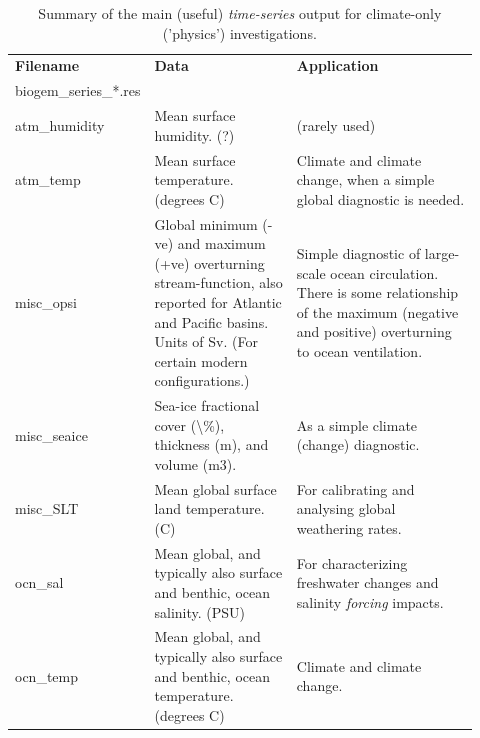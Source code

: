 \documentclass[11pt,fleqn]{book} %
\begin{document}
\begin{table}[ht]
\begin{tabular}{p{0.2\linewidth} p{0.317\linewidth} p{0.4\linewidth}}
\toprule
\textbf{Filename} & \textbf{Data} & \textbf{Application}\\
\textsf{\footnotesize biogem\_series\_*.res} & &\\
\midrule
\textsf{\footnotesize atm\_humidity} & \small{Mean surface humidity. (?)} & \small{(rarely used)}\\
\textsf{\footnotesize atm\_temp} & \small{Mean surface temperature. (degrees C)} & \small{Climate and climate change, when a simple global diagnostic is needed.}\\

\midrule

\textsf{\footnotesize misc\_opsi} & \small{Global minimum (-ve) and maximum (+ve) overturning stream-function, also reported for Atlantic and Pacific basins. Units of  Sv. (For certain modern configurations.)} & \small{Simple diagnostic of large-scale ocean circulation. There is some relationship of the maximum (negative and positive) overturning to ocean ventilation.}\\
\textsf{\footnotesize misc\_seaice} & \small{Sea-ice fractional cover (\textbackslash\%), thickness (m), and volume (m3).} & \small{As a simple climate (change) diagnostic.}\\
\textsf{\footnotesize misc\_SLT} & \small{Mean global surface land temperature. (C)} & \small{For calibrating and analysing global weathering rates.}\\
\textsf{\footnotesize ocn\_sal} & \small{Mean global, and typically also surface and benthic, ocean salinity. (PSU)} & \small{For characterizing freshwater changes and salinity \textit{forcing} impacts.}\\
\textsf{\footnotesize ocn\_temp} & \small{Mean global, and typically also surface and benthic, ocean temperature. (degrees C)} & \small{Climate and climate change. }\\

\bottomrule
\end{tabular}
\caption{Summary of the main (useful) \textit{time-series} output for climate-only ('physics') investigations.}
\end{table}
\end{document}

